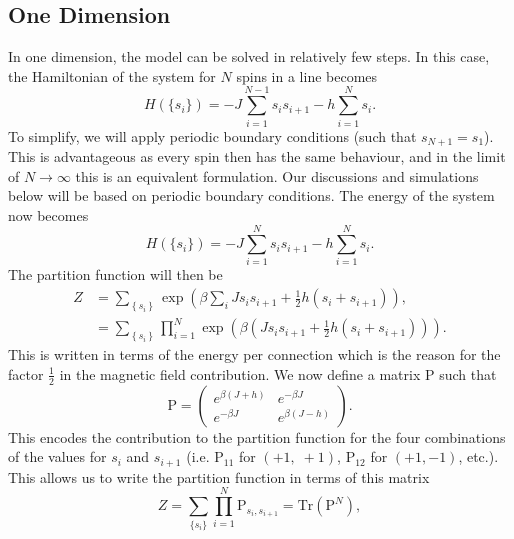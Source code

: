\documentclass[11pt]{article}
\newcommand{\bmat}[1]{\bm{\mathrm{#1}}}
\begin{document}
	\subsection{One Dimension}
	
	In one dimension, the model can be solved in relatively few steps. In this case, the Hamiltonian of the system for $N$ spins in a line becomes
	\begin{equation}
		H(\{s_i\}) = -J \sum_{i=1}^{N-1} s_i s_{i+1} -h\sum_{i=1}^N s_i.
	\end{equation}
	To simplify, we will apply periodic boundary conditions (such that $s_{N+1} = s_1$). This is advantageous as every spin then has the same behaviour, and in the limit of $N \to \infty$ this is an equivalent formulation. Our discussions and simulations below will be based on periodic boundary conditions. The energy of the system now becomes
	\begin{equation} \label{eq:Energy1D}
		H(\{s_i\}) = -J \sum_{i=1}^{N} s_i s_{i+1} -h\sum_{i=1}^N s_i.
	\end{equation}
	The partition function will then be
	\begin{equation}
		\begin{split}
			Z &= \sum_{\left\{s_i\right\}} \exp{\left(\beta \sum_i Js_is_{i+1} + \frac12 h(s_i + s_{i+1})\right)}, \\
			&= \sum_{\left\{s_i\right\}} \prod_{i=1}^N \exp{\left(\beta \left(Js_is_{i+1} + \frac12 h(s_i + s_{i+1})\right)\right)}.
		\end{split}
	\end{equation}
	This is written in terms of the energy per connection which is the reason for the factor $\frac12$ in the magnetic field contribution. We now define a matrix $\bmat{P}$ such that
	\begin{equation} \label{eq:MatrixP}
		\bmat{P} = \begin{pmatrix}
			e^{\beta(J+h)} & e^{-\beta J} \\
			e^{-\beta J} & e^{\beta(J-h)}
		\end{pmatrix}.
	\end{equation}
	This encodes the contribution to the partition function for the four combinations of the values for $s_i$ and $s_{i+1}$ (i.e. $\mathrm{P}_{11}$ for $(+1,\;+1)$, $\mathrm{P}_{12}$ for $(+1, -1)$, etc.). This allows us to write the partition function in terms of this matrix
	\begin{equation} \label{eq:PartitionFunction1DGeneral}
		Z = \sum_{\{s_i\}} \prod_{i=1}^{N} \mathrm{P}_{s_i, s_{i+1}} = \mathrm{Tr}(\bmat{P}^N),
	\end{equation}
\end{document}
